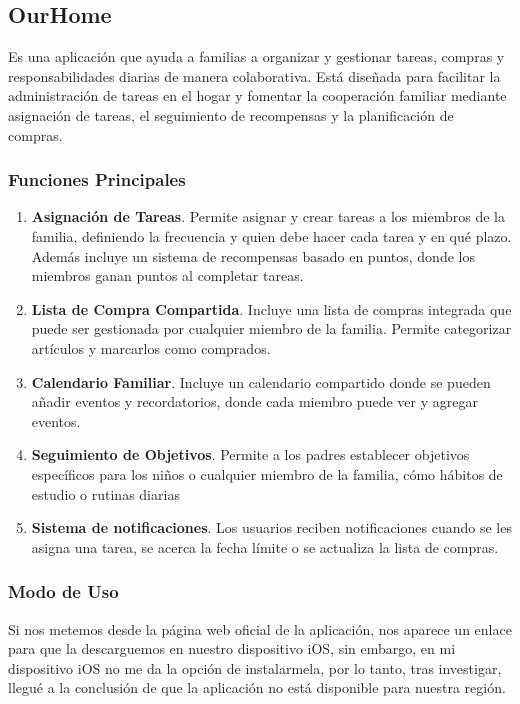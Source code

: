 \subsection{OurHome}
\label{sec:ourhome}
Es una aplicación que ayuda a familias a organizar y gestionar tareas, compras y responsabilidades diarias de manera colaborativa. 
Está diseñada para facilitar la administración de tareas en el hogar y fomentar la cooperación familiar mediante asignación de tareas, 
el seguimiento de recompensas y la planificación de compras. 

\subsubsection{Funciones Principales}
\label{subsec:funciones_ourhome}

\begin{enumerate}
    \item  \textbf{Asignación de Tareas}. Permite asignar y crear tareas a los miembros de la familia, definiendo la frecuencia y quien debe hacer cada tarea y en qué plazo.
    Además incluye un sistema de recompensas basado en puntos, donde los miembros ganan puntos al completar tareas.
    \item \textbf{Lista de Compra Compartida}. Incluye una lista de compras integrada que puede ser gestionada por cualquier miembro de la familia. Permite categorizar artículos y marcarlos como comprados.
    \item \textbf{Calendario Familiar}. Incluye un calendario compartido donde se pueden añadir eventos y recordatorios, donde cada miembro puede ver y agregar eventos.
    \item \textbf{Seguimiento de Objetivos}. Permite a los padres establecer objetivos específicos para los niños o cualquier miembro de la familia, cómo hábitos de estudio o rutinas diarias 
    \item \textbf{Sistema de notificaciones}. Los usuarios reciben notificaciones cuando se les asigna una tarea, se acerca la fecha límite o se actualiza la lista de compras.
\end{enumerate}

\subsubsection{Modo de Uso}
\label{subsec:uso_ourhome}
Si nos metemos desde la página web oficial de la aplicación, nos aparece un enlace para que la descarguemos en nuestro dispositivo iOS, 
sin embargo, en mi dispositivo iOS no me da la opción de instalarmela, por lo tanto, tras investigar, llegué a la conclusión de que la aplicación no 
está disponible para nuestra región.

